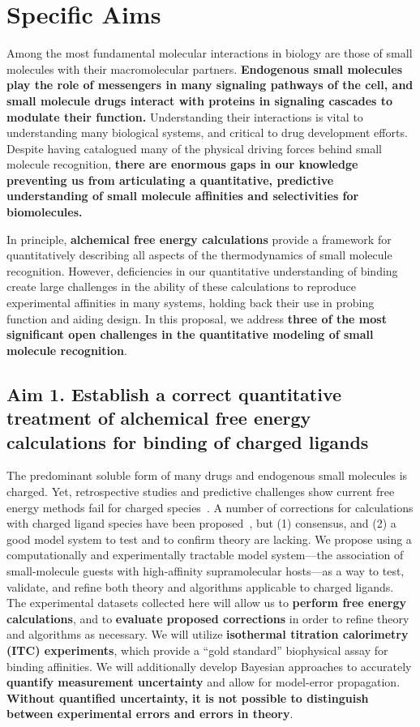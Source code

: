 \documentclass[10pt,final]{article}
\date{}
\begin{document}
\newpage
\section*{\centering Specific Aims}
Among the most fundamental molecular interactions in biology are those of small molecules with their macromolecular partners.
\textbf{Endogenous small molecules play the role of messengers in many signaling pathways of the cell, and small molecule drugs interact with proteins in signaling cascades to modulate their function.}
Understanding their interactions is vital to understanding many biological systems, and critical to drug development efforts.
Despite having catalogued many of the physical driving forces behind small molecule recognition, \textbf{there are enormous gaps in our knowledge preventing us from articulating a quantitative, predictive understanding of small molecule affinities and selectivities for biomolecules.}

In principle, \textbf{alchemical free energy calculations} provide a framework for quantitatively describing all aspects of the thermodynamics of small molecule recognition. However, deficiencies in our quantitative understanding of binding create large challenges in the ability of these calculations to reproduce experimental affinities in many systems, holding back their use in probing function and aiding design.
In this proposal, we address \textbf{three of the most significant open challenges in the quantitative modeling of small molecule recognition}.

\subsection*{Aim 1. Establish a correct quantitative treatment of alchemical free energy calculations for binding of charged ligands}
The predominant soluble form of many drugs and endogenous small molecules is charged.
Yet, retrospective studies and predictive challenges show current free energy methods fail for charged species~\cite{Rocklin2013b,Muddana2014a}.
A number of corrections for calculations with charged ligand species have been proposed~\cite{Reif2013a,Rocklin2013a, Lin2014a}, but (1) consensus, and (2) a good model system to test and to confirm theory are lacking.
We propose using a computationally and experimentally tractable model system---the association of small-molecule guests with high-affinity supramolecular hosts---as a way to test, validate, and refine both theory and algorithms applicable to charged ligands.
The experimental datasets collected here will allow us to \textbf{ perform free energy calculations}, and to \textbf{ evaluate proposed corrections} in order to refine theory and algorithms as necessary.
We will utilize \textbf{ isothermal titration calorimetry (ITC) experiments}, which provide a “gold standard” biophysical assay for binding affinities.
We will additionally develop Bayesian approaches to accurately \textbf{ quantify measurement uncertainty} and allow for model-error propagation. \textbf{Without quantified uncertainty, it is not possible to distinguish between experimental errors and errors in theory}.
\end{document}
